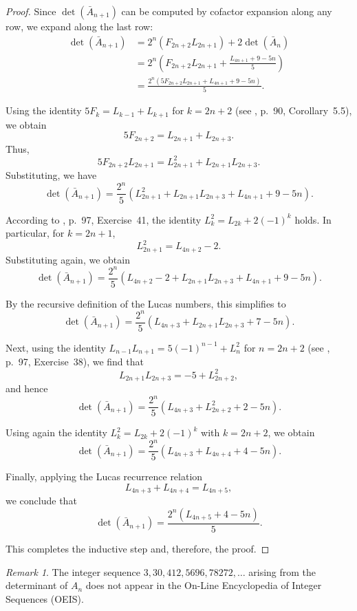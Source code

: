 \documentclass[11pt]{birkjour}
\theoremstyle{definition}
\theoremstyle{remark}
\newtheorem{rem}[thm]{Remark}
\numberwithin{equation}{section}
\begin{document}
\begin{proof}
Since $\det(\bar{A}_{n+1})$ can be computed by cofactor expansion along any row, we expand along the last row:
\begin{align*}
\det(\bar{A}_{n+1}) &= 2^n(F_{2n+2}L_{2n+1}) + 2\det(\bar{A}_n) \\
&= 2^n\left(F_{2n+2} L_{2n+1} + \frac{L_{4n+1} + 9 - 5n}{5}\right) \\
&= \frac{2^n \left(5 F_{2n+2} L_{2n+1} + L_{4n+1} + 9 - 5n\right)}{5}.
\end{align*}

Using the identity $5F_k = L_{k - 1} + L_{k + 1}$ for $k = 2n+2$ (see \cite{koshy}, p.~90, Corollary~5.5), we obtain
\[
5F_{2n+2} = L_{2n+1} + L_{2n+3}.
\]
Thus,
\[
5 F_{2n+2} L_{2n+1} = L_{2n+1}^2 + L_{2n+1} L_{2n+3}.
\]
Substituting, we have
\[
\det(\bar{A}_{n+1}) = \frac{2^n}{5} \left(L_{2n+1}^2 + L_{2n+1} L_{2n+3} + L_{4n+1} + 9 - 5n\right).
\]

According to \cite{koshy}, p.~97, Exercise~41, the identity $L_k^2 = L_{2k} + 2(-1)^k$ holds. In particular, for $k = 2n + 1$,
\[
L_{2n+1}^2 = L_{4n+2} - 2.
\]
Substituting again, we obtain
\[
\det(\bar{A}_{n+1}) = \frac{2^n}{5} \left(L_{4n+2} - 2 + L_{2n+1} L_{2n+3} + L_{4n+1} + 9 - 5n\right).
\]

By the recursive definition of the Lucas numbers, this simplifies to
\[
\det(\bar{A}_{n+1}) = \frac{2^n}{5} \left(L_{4n+3} + L_{2n+1} L_{2n+3} + 7 - 5n\right).
\]

Next, using the identity $L_{n-1}L_{n+1} = 5(-1)^{n-1} + L_n^2$ for $n = 2n + 2$ (see \cite{koshy}, p.~97, Exercise~38), we find that
\[
L_{2n+1} L_{2n+3} = -5 + L_{2n+2}^2,
\]
and hence
\[
\det(\bar{A}_{n+1}) = \frac{2^n}{5} \left(L_{4n+3} + L_{2n+2}^2 + 2 - 5n\right).
\]

Using again the identity $L_k^2 = L_{2k} + 2(-1)^k$ with $k = 2n+2$, we obtain
\[
\det(\bar{A}_{n+1}) = \frac{2^n}{5} \left(L_{4n+3} + L_{4n+4} + 4 - 5n\right).
\]

Finally, applying the Lucas recurrence relation
\[
L_{4n+3} + L_{4n+4} = L_{4n+5},
\]
we conclude that
\[
\det(\bar{A}_{n+1}) = \frac{2^n (L_{4n+5} + 4 - 5n)}{5}.
\]

This completes the inductive step and, therefore, the proof.
\end{proof}


\begin{rem}
The integer sequence $3, 30, 412, 5696, 78272, \ldots$ arising from the determinant of $A_n$ does not appear in the On-Line Encyclopedia of Integer Sequences (OEIS).
\end{rem}
\end{document}
